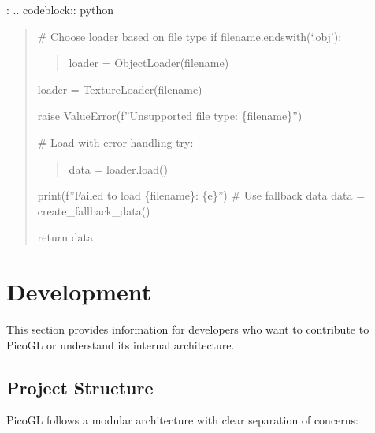 \documentclass[a4paper,10pt,english,openany,oneside]{sphinxmanual}
\begin{document}
\sphinxAtStartPar
{}:
.. code\sphinxhyphen{}block:: python
\begin{quote}

\sphinxAtStartPar
\# Choose loader based on file type
if filename.endswith(‘.obj’):
\begin{quote}

\sphinxAtStartPar
loader = ObjectLoader(filename)
\end{quote}
\begin{description}
\sphinxAtStartPar
loader = TextureLoader(filename)

\sphinxAtStartPar
raise ValueError(f”Unsupported file type: \{filename\}”)

\end{description}

\sphinxAtStartPar
\# Load with error handling
try:
\begin{quote}

\sphinxAtStartPar
data = loader.load()
\end{quote}
\begin{description}
\sphinxAtStartPar
print(f”Failed to load \{filename\}: \{e\}”)
\# Use fallback data
data = create\_fallback\_data()

\end{description}

\sphinxAtStartPar
return data
\end{quote}

\sphinxstepscope


\section{Development}
\label{\detokenize{development:development}}\label{\detokenize{development::doc}}
\sphinxAtStartPar
This section provides information for developers who want to contribute to PicoGL or understand its internal architecture.


\subsection{Project Structure}
\label{\detokenize{development:project-structure}}
\sphinxAtStartPar
PicoGL follows a modular architecture with clear separation of concerns:
\end{document}
